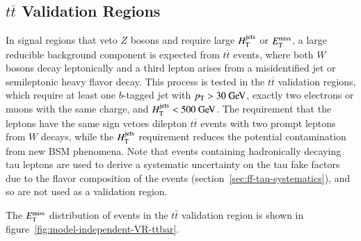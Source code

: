 \subsection{$t\overline{t}$ Validation Regions}\label{sec:model-independent-validation-regions-ttbar}
In signal regions that veto $Z$ bosons and require large $H_{\mathrm{T}}^{\mathrm{jets}}$ or $E_{\text{T}}^{\text{miss}}$, a large reducible background component is expected from $t\overline{t}$ events, where both $W$ bosons decay leptonically and a third lepton arises from a misidentified jet or semileptonic heavy flavor decay. This process is tested in the $t\overline{t}$ validation regions, which require at least one $b$-tagged jet with $\pt>30 \GeV$, exactly two electrons or muons with the same charge, and $\Ht<500 \GeV$. The requirement that the leptons have the same sign vetoes dilepton $t\overline{t}$ events with two prompt leptons from $W$ decays, while the $H_{\mathrm{T}}^{\mathrm{jets}}$ requirement reduces the potential contamination from new BSM phenomena. Note that events containing hadronically decaying tau leptons are used to derive a systematic uncertainty on the tau fake factors due to the flavor composition of the events (section~\ref{sec:ff-tau-systematics}), and so are not used as a validation region. 


The $E_{\text{T}}^{\text{miss}}$ distribution of events in the $t\bar{t}$ validation region is shown in figure~\ref{fig:model-independent-VR-ttbar}.

